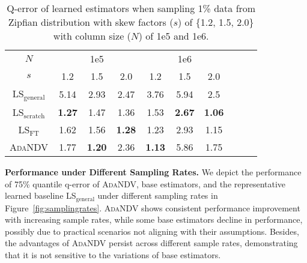 \begin{table}[t]
    \centering
    \caption{{Q-error of learned estimators when sampling 1\% data from Zipfian distribution with skew factors ($s$) of \{1.2, 1.5, 2.0\} with column size ($N$) of 1e5 and 1e6.}}
    \label{tab:zipf}
    \begin{tabular}{c|ccc|cccccc}
\toprule
       $N$ & \multicolumn{3}{c}{1e5} & \multicolumn{3}{c}{1e6} \\
    $s$  &  1.2 & 1.5 & 2.0  &  1.2 & 1.5 & 2.0    \\
\hline
    LS$_{\mathrm{general}}$ & 5.14& 2.93& 2.47& 3.76& 5.94& 2.5 \\
    LS$_{\mathrm{scratch}}$  & \textbf{1.27}& 1.47& 1.36& 1.53& \textbf{2.67}& \textbf{1.06}  \\
    LS$_{\mathrm{FT}}$ & 1.62& 1.56& \textbf{1.28}& 1.23& 2.93& 1.15 \\
    \textsc{AdaNDV} & 1.77& \textbf{1.20}& 2.36& \textbf{1.13}& 5.86& 1.75\\

\bottomrule
    \end{tabular}
\end{table}






\noindent\textbf{{Performance under Different Sampling Rates.}} 
{
We depict the performance of 75\% quantile q-error of \textsc{AdaNDV}, base estimators, and the representative learned baseline LS$_{\mathrm{general}}$ under different sampling rates in Figure~\ref{fig:samplingrates}. \textsc{AdaNDV} shows consistent performance improvement with increasing sample rates, while some base estimators decline in performance, possibly due to practical scenarios not aligning with their assumptions. Besides, the advantages of \textsc{AdaNDV} persist across different sample rates, demonstrating that it is not sensitive to the variations of base estimators.
}


